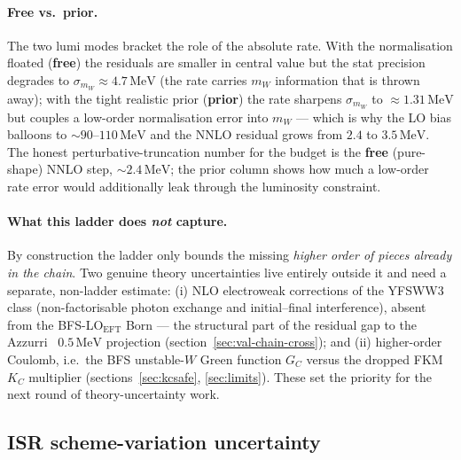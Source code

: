 \documentclass[11pt,a4paper]{article}
\newcommand{\mW}{m_W}
\newcommand{\MeV}{\ensuremath{\,\mathrm{MeV}}}
\begin{document}
\paragraph{Free vs.\ prior.}
The two lumi modes bracket the role of the absolute rate. With the
normalisation floated (\textbf{free}) the residuals are smaller in
central value but the stat precision degrades to
$\sigma_{\mW}\!\approx\!4.7\MeV$ (the rate carries $\mW$ information that
is thrown away); with the tight realistic prior (\textbf{prior}) the rate
sharpens $\sigma_{\mW}$ to $\approx\!1.31\MeV$ but couples a low-order
normalisation error into $\mW$ --- which is why the LO bias balloons to
$\sim\!90$--$110\MeV$ and the NNLO residual grows from $2.4$ to $3.5\MeV$. The
honest perturbative-truncation number for the budget is the
\textbf{free} (pure-shape) NNLO step, $\sim\!2.4\MeV$; the prior column
shows how much a low-order rate error would additionally leak through the
luminosity constraint.

\paragraph{What this ladder does \emph{not} capture.}
By construction the ladder only bounds the missing \emph{higher order of
pieces already in the chain}. Two genuine theory uncertainties live
entirely outside it and need a separate, non-ladder estimate:
(i) NLO electroweak corrections of the YFSWW3 class (non-factorisable
photon exchange and initial--final interference), absent from the
BFS-LO$_\text{EFT}$ Born --- the structural part of the residual gap to
the Azzurri~\cite{Azzurri2021} $0.5\MeV$ projection
(section~\ref{sec:val-chain-cross}); and (ii) higher-order Coulomb,
i.e.\ the BFS unstable-$W$ Green function $G_C$ versus the dropped FKM
$K_C$ multiplier (sections~\ref{sec:kcsafe}, \ref{sec:limits}). These set
the priority for the next round of theory-uncertainty work.

\subsection{ISR scheme-variation uncertainty}\label{sec:val-isr-scheme}
\end{document}
